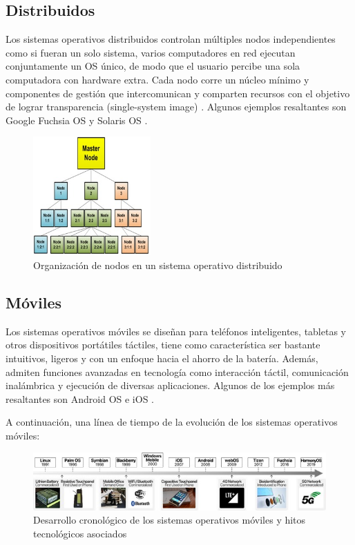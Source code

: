 \subsection{Distribuidos}
Los sistemas operativos distribuidos controlan múltiples nodos independientes como si fueran un solo sistema, varios computadores en red ejecutan conjuntamente un OS único, de modo que el usuario percibe una sola computadora con hardware extra. Cada nodo corre un núcleo mínimo y componentes de gestión que intercomunican y comparten recursos con el objetivo de lograr transparencia (single-system image) \citep{garg2013dos}. Algunos ejemplos resaltantes son Google Fuchsia OS y Solaris OS \citep{rawat2025osstudy}.  

\begin{figure}[H]
    \centering
    \includegraphics[width=0.4\textwidth]{figures/distributedSistems.jpg}
    \caption[Organización de nodos en un sistema operativo distribuido]%
            {Organización de nodos en un sistema operativo distribuido \citep{garg2013dos}}
    \label{fig:distributed_os}
\end{figure} 

\subsection{Móviles}
Los sistemas operativos móviles se diseñan para teléfonos inteligentes, tabletas y otros dispositivos portátiles táctiles, tiene como característica ser bastante intuitivos, ligeros y con un enfoque hacia el ahorro de la batería. Además, admiten funciones avanzadas en tecnología como interacción táctil, comunicación inalámbrica y ejecución de diversas aplicaciones. Algunos de los ejemplos más resaltantes son Android OS e iOS \citep{rawat2025osstudy}.  

A continuación, una línea de tiempo de la evolución de los sistemas operativos móviles:  

\begin{figure}[H]
    \centering
    \includegraphics[width=1.0\textwidth]{figures/timeLineMobile.jpg}
    \caption[Desarrollo cronológico de los sistemas operativos móviles y hitos tecnológicos asociados]
            {Desarrollo cronológico de los sistemas operativos móviles y hitos tecnológicos asociados \citep{jia2024acos}}
    \label{fig:mobile_os}
\end{figure} 

